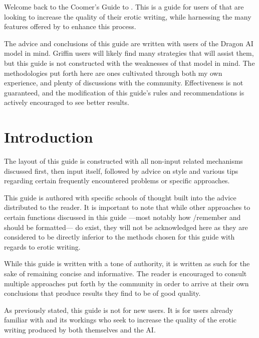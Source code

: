 \documentclass[Source-main.tex]{subfiles}
\begin{document}
\label{ch:preface}

Welcome back to the Coomer’s Guide to \aid.
This is a guide for users of \aid that are looking to increase the quality of their erotic writing, while harnessing the many features offered by \aid to enhance this process.

The advice and conclusions of this guide are written with users of the Dragon AI model in mind.
Griffin users will likely find many strategies that will assist them, but this guide is not constructed with the weaknesses of that model in mind.
The methodologies put forth here are ones cultivated through both my own experience, and plenty of discussions with the \aid community.
Effectiveness is not guaranteed, and the modification of this guide’s rules and recommendations is actively encouraged to see better results.


\chapter{Introduction}
\label{ch:intro}

The layout of this guide is constructed with all non-input related mechanisms discussed first, then input itself, followed by advice on style and various tips regarding certain frequently encountered problems or specific approaches.

This guide is authored with specific schools of thought built into the advice distributed to the reader.
It is important to note that while other approaches to certain functions discussed in this guide —most notably how /remember and \wi should be formatted— do exist, they will not be acknowledged here as they are considered to be directly inferior to the methods chosen for this guide with regards to erotic writing.

While this guide is written with a tone of authority, it is written as such for the sake of remaining concise and informative.
The reader is encouraged to consult multiple approaches put forth by the community in order to arrive at their own conclusions that produce results they find to be of good quality.

As previously stated, this guide is not for new users.
It is for users already familiar with \aid and its workings who seek to increase the quality of the erotic writing produced by both themselves and the AI.
\end{document}
